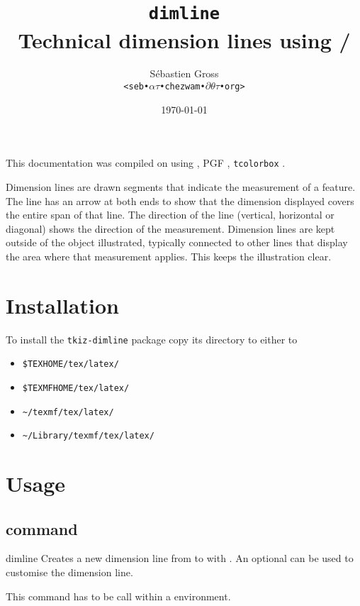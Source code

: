 \documentclass[a4paper]{article}
\title{\texttt{dimline}\\ Technical dimension lines using \PGF/\TikZ}
\author{Sébastien Gross\\ \texttt{<seb•$\alpha\tau$•chezwam•$\partial\theta\tau$•org>}}
\date{\today}
\makeatletter
\newcommand{\compilator}{\XeLaTeX{}}
\newcommand{\cversion}{\the\XeTeXversion\XeTeXrevision}
\newcommand{\compilator}{\LaTeX{}}
\newcommand{\cversion}{
\ifnum\pdftexversion<100 %
          \the\pdftexversion.\pdftexrevision
        \else
          \ifnum\pdftexversion<130 %
            \expandafter\@car\the\pdftexversion\@empty\@nil.%
            \expandafter\@cdr\the\pdftexversion\@empty\@nil  
            \pdftexrevision
          \else
            \expandafter\@car\the\pdftexversion\@empty\@nil.%
            \expandafter\@cdr\the\pdftexversion\@empty\@nil.%
            \pdftexrevision
          \fi
        \fi
}
\newcommand{\PGF}{\textsc{PGF}}
\makeatother
\begin{document}
\maketitle

\begin{tcolorbox}[title={Contents},fonttitle=\bfseries\Large,
  colback=yellow!10!white,colframe=red!50!black,before=\par\bigskip\noindent]
\makeatletter
{}
\makeatother
\end{tcolorbox}

\makeatletter
This documentation was compiled on {\platformname} using {\compilator}
{\cversion}, {\PGF} {\pgfversion}, \texttt{tcolorbox} \tcb@version.
\makeatother


Dimension lines are drawn segments that indicate the measurement of a
feature. The line has an arrow at both ends to show that the dimension
displayed covers the entire span of that line. The direction of the line
(vertical, horizontal or diagonal) shows the direction of the
measurement. Dimension lines are kept outside of the object illustrated,
typically connected to other lines that display the area where that
measurement applies. This keeps the illustration clear.


\section{Installation}

To install the \verb"tkiz-dimline" package copy its directory to either to
\begin{itemize}
\item \verb"$TEXHOME/tex/latex/"
\item \verb"$TEXMFHOME/tex/latex/"
\item \verb"~/texmf/tex/latex/"
\item \verb"~/Library/texmf/tex/latex/"
\end{itemize}

\section{Usage}

\subsection{command}
\begin{docCommand}{dimline}{}
  Creates a new dimension line from  to  with
  . An optional  can be used to customise the
  dimension line.

  This command has to be call within a 
  environment.

\end{docCommand}
\end{document}
